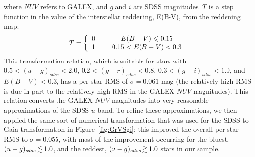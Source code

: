 \documentclass[fleqn,usenatbib]{mnras}
\begin{document}
where $NUV$ refers to GALEX, and $g$ and $i$ are SDSS magnitudes. $T$ is a step function in the value of the interstellar reddening, E(B-V),
from the \citet{1998ApJ...500..525S} reddening map:
\begin{align}
  T = \left\{ \begin{array}{cc} 
    0 & \hspace{5mm} E(B-V) \leq 0.15 \\
    1 & \hspace{5mm} 0.15 < E(B-V) < 0.3 \\
  \end{array} \right.
\end{align}
This transformation relation, which is suitable for stars with $0.5 <
(u-g)_{sdss} < 2.0$, $0.2 < (g-r)_{sdss} < 0.8$, $0.3 < (g-i)_{sdss} <
1.0$, and $E(B-V) < 0.3$, has a per star RMS of $\sigma=0.061$ mag
(the relatively high RMS is due in part to the relatively high RMS in
the GALEX $NUV$ magnitudes).  This relation converts the GALEX $NUV$
magnitudes into very reasonable approximations of the SDSS $u$-band.
To refine these approximations, we then applied the same sort of
numerical transformation that was used for the SDSS to Gaia
transformation in Figure~\ref{fig:GrVSgi}; this improved the overall
per star RMS to $\sigma=0.055$, with most of the improvement occurring
for the bluest, $(u-g)_{sdss} \la 1.0$, and the reddest, $(u-g)_{sdss}
\ga 1.0$ stars in our sample.
\end{document}
